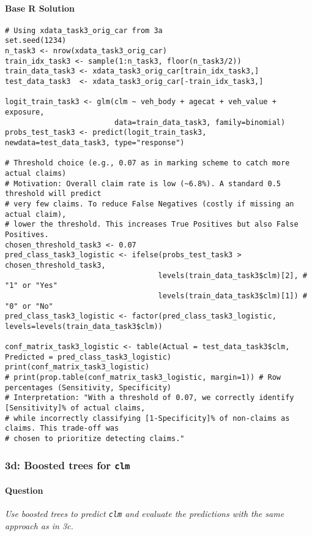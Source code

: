 \documentclass[12pt,a4paper]{article}
\newcommand{\Rcode}[1]{\texttt{#1}} %
\begin{document}
        \paragraph{Base R Solution}
\begin{lstlisting}[]
# Using xdata_task3_orig_car from 3a
set.seed(1234) 
n_task3 <- nrow(xdata_task3_orig_car)
train_idx_task3 <- sample(1:n_task3, floor(n_task3/2))
train_data_task3 <- xdata_task3_orig_car[train_idx_task3,]
test_data_task3  <- xdata_task3_orig_car[-train_idx_task3,]

logit_train_task3 <- glm(clm ~ veh_body + agecat + veh_value + exposure, 
                         data=train_data_task3, family=binomial)
probs_test_task3 <- predict(logit_train_task3, newdata=test_data_task3, type="response")

# Threshold choice (e.g., 0.07 as in marking scheme to catch more actual claims)
# Motivation: Overall claim rate is low (~6.8%). A standard 0.5 threshold will predict
# very few claims. To reduce False Negatives (costly if missing an actual claim),
# lower the threshold. This increases True Positives but also False Positives.
chosen_threshold_task3 <- 0.07 
pred_class_task3_logistic <- ifelse(probs_test_task3 > chosen_threshold_task3, 
                                   levels(train_data_task3$clm)[2], # "1" or "Yes"
                                   levels(train_data_task3$clm)[1]) # "0" or "No"
pred_class_task3_logistic <- factor(pred_class_task3_logistic, levels=levels(train_data_task3$clm))

conf_matrix_task3_logistic <- table(Actual = test_data_task3$clm, Predicted = pred_class_task3_logistic)
print(conf_matrix_task3_logistic)
# print(prop.table(conf_matrix_task3_logistic, margin=1)) # Row percentages (Sensitivity, Specificity)
# Interpretation: "With a threshold of 0.07, we correctly identify [Sensitivity]% of actual claims,
# while incorrectly classifying [1-Specificity]% of non-claims as claims. This trade-off was
# chosen to prioritize detecting claims."
\end{lstlisting}

    \subsubsection{3d: Boosted trees for \Rcode{clm}}
        \paragraph{Question}
        \textit{Use boosted trees to predict \Rcode{clm} and evaluate the predictions with the same approach as in 3c.}
\end{document}
